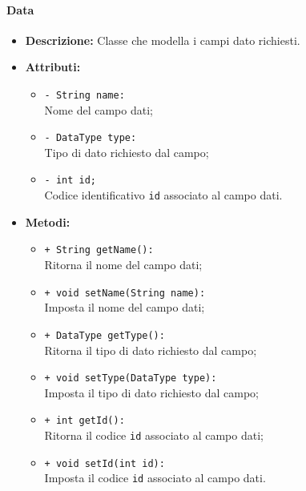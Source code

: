 \paragraph{Data}
\label{botdata}
\begin{flushleft}
\begin{itemize}
\item \textbf{Descrizione:} Classe che modella i campi dato richiesti.
\item \textbf{Attributi:}
\begin{sloppypar}
\begin{itemize}
\item \texttt{- String name:}\\ Nome del campo dati;
\item \texttt{- DataType type:}\\ Tipo di dato richiesto dal campo;
\item \texttt{- int id;}\\Codice identificativo \texttt{id} associato al campo dati.
\end{itemize}
\end{sloppypar}
\item \textbf{Metodi:}
\begin{sloppypar}
\begin{itemize}
\item \texttt{+ String getName():}\\ Ritorna il nome del campo dati;
\item \texttt{+ void setName(String name):}\\ Imposta il nome del campo dati;
\item \texttt{+ DataType getType():}\\ Ritorna il tipo di dato richiesto dal campo;
\item \texttt{+ void setType(DataType type):}\\ Imposta il tipo di dato richiesto dal campo;
\item \texttt{+ int getId():}\\ Ritorna il codice \texttt{id} associato al campo dati;
\item \texttt{+ void setId(int id):}\\ Imposta il codice \texttt{id} associato al campo dati.
\end{itemize}
\end{sloppypar}
\end{itemize}
\end{flushleft}

